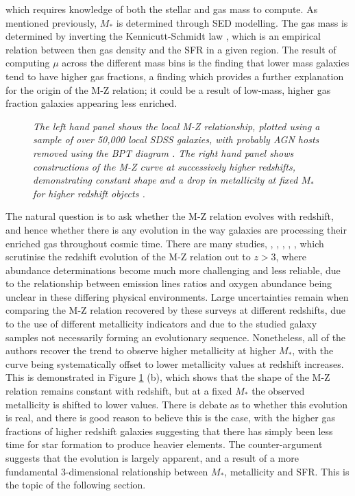 \documentclass{literature}
\begin{document}
which requires knowledge of both the stellar and gas mass to compute. As mentioned previously, $M_{*}$ is determined through SED modelling. The gas mass is determined by inverting the Kennicutt-Schmidt law \citep{Kennicutt1998}, which is an empirical relation between then gas density and the SFR in a given region. The result of computing $\mu$ across the different mass bins is the finding that lower mass galaxies tend to have higher gas fractions, a finding which provides a further explanation for the origin of the M-Z relation; it could be a result of low-mass, higher gas fraction galaxies appearing less enriched.  
 \\ 
\begin{figure}[!htp]
\centering
{}
\caption{\footnotesize{\emph{The left hand panel shows the local M-Z relationship, plotted using a sample of over 50,000 local SDSS galaxies, with probably AGN hosts removed using the BPT diagram \citep{Tremonti2004}. The right hand panel shows constructions of the M-Z curve at successively higher redshifts, demonstrating constant shape and a drop in metallicity at fixed $M_{*}$ for higher redshift objects \citep{Maiolino2008}.}}}
\label{fig:steidel_mzr}
\end{figure}


The natural question is to ask whether the M-Z relation evolves with redshift, and hence whether there is any evolution in the way galaxies are processing their enriched gas throughout cosmic time. There are many studies, \citep{Savaglio2005}, \citep{Erb_2006}, \citep{Maiolino2008}, \citep{Henry2013}, \citep{Wuyts_2014}, \citep{Steidel2014} which scrutinise the redshift evolution of the M-Z relation out to $z > 3$, where abundance determinations become much more challenging and less reliable, due to the relationship between emission lines ratios and oxygen abundance being unclear in these differing physical environments. Large uncertainties remain when comparing the M-Z relation recovered by these surveys at different redshifts, due to the use of different metallicity indicators and due to the studied galaxy samples not necessarily forming an evolutionary sequence. Nonetheless, all of the authors recover the trend to observe higher metallicity at higher $M_{*}$, with the curve being systematically offset to lower metallicity values at redshift increases. This is demonstrated in Figure \ref{fig:steidel_mzr} (b), which shows that the shape of the M-Z relation remains constant with redshift, but at a fixed $M_{*}$ the observed metallicity is shifted to lower values. There is debate as to whether this evolution is real, and there is good reason to believe this is the case, with the higher gas fractions of higher redshift galaxies suggesting that there has simply been less time for star formation to produce heavier elements. The counter-argument suggests that the evolution is largely apparent, and a result of a more fundamental 3-dimensional relationship between $M_{*}$, metallicity and SFR. This is the topic of the following section.
\end{document}
